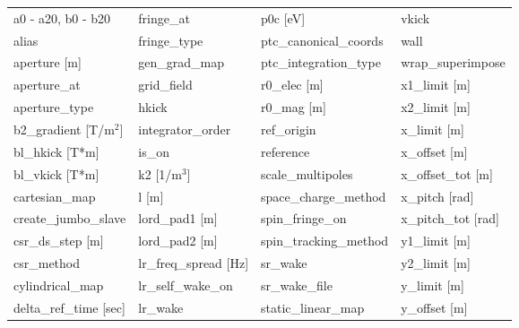  \begin{tabular}{llll} \toprule
a0 - a20, b0 - b20               & fringe_at                        & p0c [eV]                         & vkick                            \\
alias                            & fringe_type                      & ptc_canonical_coords             & wall                             \\
aperture [m]                     & gen_grad_map                     & ptc_integration_type             & wrap_superimpose                 \\
aperture_at                      & grid_field                       & r0_elec [m]                      & x1_limit [m]                     \\
aperture_type                    & hkick                            & r0_mag [m]                       & x2_limit [m]                     \\
b2_gradient [T/m$^2$]            & integrator_order                 & ref_origin                       & x_limit [m]                      \\
bl_hkick [T*m]                   & is_on                            & reference                        & x_offset [m]                     \\
bl_vkick [T*m]                   & k2 [1/m$^3$]                     & scale_multipoles                 & x_offset_tot [m]                 \\
cartesian_map                    & l [m]                            & space_charge_method              & x_pitch [rad]                    \\
create_jumbo_slave               & lord_pad1 [m]                    & spin_fringe_on                   & x_pitch_tot [rad]                \\
csr_ds_step [m]                  & lord_pad2 [m]                    & spin_tracking_method             & y1_limit [m]                     \\
csr_method                       & lr_freq_spread [Hz]              & sr_wake                          & y2_limit [m]                     \\
cylindrical_map                  & lr_self_wake_on                  & sr_wake_file                     & y_limit [m]                      \\
delta_ref_time [sec]             & lr_wake                          & static_linear_map                & y_offset [m]                     \\

\end{tabular}

